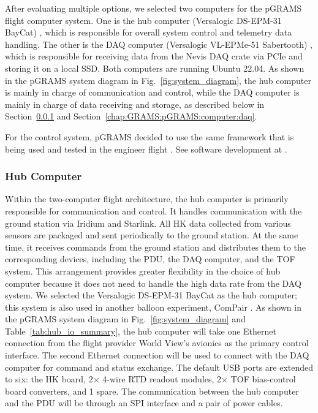 After evaluating multiple options, we selected two computers for the pGRAMS flight computer system. One is the hub computer (Versalogic DS-EPM-31 BayCat) \cite{versalogic_baycat}, which is responsible for overall system control and telemetry data handling. The other is the DAQ computer (Versalogic VL-EPMe-51 Sabertooth) \cite{versalogic_sabertooth}, which is responsible for receiving data from the Nevis DAQ crate via PCIe and storing it on a local SSD. Both computers are running Ubuntu 22.04.
As shown in the pGRAMS system diagram in Fig.~\ref{fig:system_diagram}, the hub computer is mainly in charge of communication and control, while the DAQ computer is mainly in charge of data receiving and storage, as described below in Section~\ref{chap:GRAMS:pGRAMS:computer:hub} and Section~\ref{chap:GRAMS:pGRAMS:computer:daq}.

For the control system, pGRAMS decided to use the same framework that is being used and tested in the engineer flight \cite{Nakajima:2024fgx}. See software development at \cite{pGramsFC_2024}.

\subsubsection{Hub Computer}
\label{chap:GRAMS:pGRAMS:computer:hub}
Within the two-computer flight architecture, the hub computer is primarily responsible for communication and control. It handles communication with the ground station via Iridium and Starlink. All \ac{HK} data collected from various sensors are packaged and sent periodically to the ground station. At the same time, it receives commands from the ground station and distributes them to the corresponding devices, including the \ac{PDU}, the DAQ computer, and the \ac{TOF} system. This arrangement provides greater flexibility in the choice of hub computer because it does not need to handle the high data rate from the \ac{DAQ} system. We selected the Versalogic DS-EPM-31 BayCat \cite{versalogic_baycat} as the hub computer; this system is also used in another balloon experiment, ComPair \cite{10.1117/12.2628811}.
As shown in the pGRAMS system diagram in Fig.~\ref{fig:system_diagram} and Table~\ref{tab:hub_io_summary}, the hub computer will take one Ethernet connection from the flight provider World View's avionics \cite{worldviewspace2025} as the primary control interface. The second Ethernet connection will be used to connect with the DAQ computer for command and status exchange. The default USB ports are extended to six: the \ac{HK} board, 2$\times$ 4-wire \ac{RTD} readout modules, 2$\times$ \ac{TOF} bias-control board converters, and 1 spare. The communication between the hub computer and the \ac{PDU} will be through an SPI interface and a pair of power cables.

